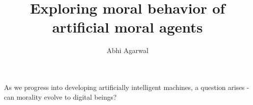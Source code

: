 \documentclass[11pt, oneside]{article}
\title{Exploring moral behavior of artificial moral agents}
\author{Abhi Agarwal}
\date{}
\begin{document}
\maketitle

\par As we progress into developing artificially intelligent machines, a question arises - can morality evolve to digital beings? 
\end{document}
